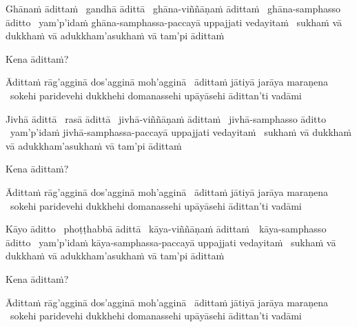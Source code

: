 \ifbfive\clearpage\fi
\ifafive\clearpage\fi

\begin{pali-hang}
  Ghānaṁ ādittaṁ \breathmark\ gandhā ādittā \breathmark\ ghāna-viññāṇaṁ ādittaṁ \breathmark\ ghāna-samphasso āditto \breathmark\ yam'p'idaṁ ghāna-samphassa-paccayā uppajjati vedayitaṁ \breathmark\ sukhaṁ vā dukkhaṁ vā adukkham'asukhaṁ vā tam'pi ādittaṁ
\end{pali-hang}
\begin{pali-hang-together}
  Kena ādittaṁ?
\end{pali-hang-together}
\begin{pali-hang-together}
  Ādittaṁ rāg'agginā dos'agginā moh'agginā \breathmark\ ādittaṁ jātiyā jarāya maraṇena \breathmark\ sokehi paridevehi dukkhehi domanassehi upāyāsehi ādittan'ti vadāmi
\end{pali-hang-together}

\begin{pali-hang}
  Jivhā ādittā \breathmark\ rasā ādittā \breathmark\ jivhā-viññāṇaṁ ādittaṁ \breathmark\ jivhā-samphasso āditto \breathmark\ yam'p'idaṁ jivhā-samphassa-paccayā uppajjati vedayitaṁ \breathmark\ sukhaṁ vā dukkhaṁ vā adukkham'asukhaṁ vā tam'pi ādittaṁ
\end{pali-hang}
\begin{pali-hang-together}
  Kena ādittaṁ?
\end{pali-hang-together}
\begin{pali-hang-together}
  Ādittaṁ rāg'agginā dos'agginā moh'agginā \breathmark\ ādittaṁ jātiyā jarāya maraṇena \breathmark\ sokehi paridevehi dukkhehi domanassehi upāyāsehi ādittan'ti vadāmi
\end{pali-hang-together}

\ifninebythirteen\clearpage\fi

\begin{pali-hang}
  Kāyo āditto \breathmark\ phoṭṭhabbā ādittā \breathmark\ kāya-viññāṇaṁ \mbox{ādittaṁ}~\breathmark\ kāya-samphasso āditto \breathmark\ yam'p'idaṁ kāya-samphassa-paccayā uppajjati vedayitaṁ \breathmark\ sukhaṁ vā dukkhaṁ vā adukkham'asukhaṁ vā tam'pi ādittaṁ
\end{pali-hang}
\begin{pali-hang-together}
  Kena ādittaṁ?
\end{pali-hang-together}
\begin{pali-hang-together}
  Ādittaṁ rāg'agginā dos'agginā moh'agginā \breathmark\ ādittaṁ jātiyā jarāya maraṇena \breathmark\ sokehi paridevehi dukkhehi domanassehi upāyāsehi ādittan'ti vadāmi
\end{pali-hang-together}

